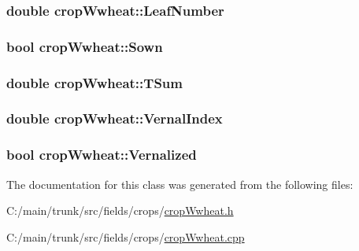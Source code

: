 \label{classcrop_wwheat_aef2d9cfa48e1900ebe12ea941d9a5c29}
\hypertarget{classcrop_wwheat_a9a61a270f58f56b99415565bacbc7593}{
\subsubsection[{LeafNumber}]{\setlength{\rightskip}{0pt plus 5cm}double {\bf cropWwheat::LeafNumber}}}
\label{classcrop_wwheat_a9a61a270f58f56b99415565bacbc7593}
\hypertarget{classcrop_wwheat_a08798879fdcd00a5dbbfa8307d58ed16}{
\subsubsection[{Sown}]{\setlength{\rightskip}{0pt plus 5cm}bool {\bf cropWwheat::Sown}}}
\label{classcrop_wwheat_a08798879fdcd00a5dbbfa8307d58ed16}
\hypertarget{classcrop_wwheat_a344306614fe2a9d6eca60d40495f75f5}{
\subsubsection[{TSum}]{\setlength{\rightskip}{0pt plus 5cm}double {\bf cropWwheat::TSum}}}
\label{classcrop_wwheat_a344306614fe2a9d6eca60d40495f75f5}
\hypertarget{classcrop_wwheat_aab8c0008d737c8d956fb6aae9e4836cf}{
\subsubsection[{VernalIndex}]{\setlength{\rightskip}{0pt plus 5cm}double {\bf cropWwheat::VernalIndex}}}
\label{classcrop_wwheat_aab8c0008d737c8d956fb6aae9e4836cf}
\hypertarget{classcrop_wwheat_a5b0ae3b52fec5932b9ca55964db35af4}{
\subsubsection[{Vernalized}]{\setlength{\rightskip}{0pt plus 5cm}bool {\bf cropWwheat::Vernalized}}}
\label{classcrop_wwheat_a5b0ae3b52fec5932b9ca55964db35af4}


The documentation for this class was generated from the following files:\begin{DoxyCompactItemize}
\item 
C:/main/trunk/src/fields/crops/\hyperlink{crop_wwheat_8h}{cropWwheat.h}\item 
C:/main/trunk/src/fields/crops/\hyperlink{crop_wwheat_8cpp}{cropWwheat.cpp}\end{DoxyCompactItemize}
